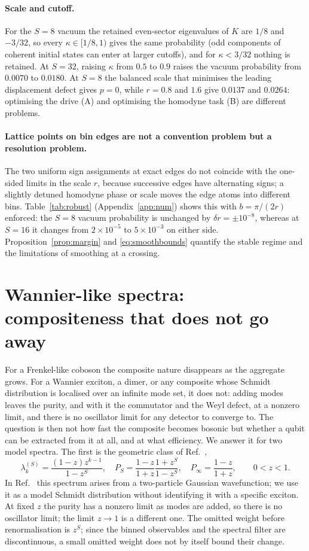 \documentclass[11pt,a4paper]{article}
\begin{document}
\paragraph{Scale and cutoff.}
For the $S=8$ vacuum the retained even-sector eigenvalues of $K$ are $1/8$ and $-3/32$, so every $\kappa\in[1/8,1)$ gives the same probability (odd components of coherent initial states can enter at larger cutoffs), and for $\kappa<3/32$ nothing is retained. At $S=32$, raising $\kappa$ from $0.5$ to $0.9$ raises the vacuum probability from $0.0070$ to $0.0180$. At $S=8$ the balanced scale that minimises the leading displacement defect gives $p=0$, while $r=0.8$ and $1.6$ give $0.0137$ and $0.0264$: optimising the drive (A) and optimising the homodyne task (B) are different problems.

\paragraph{Lattice points on bin edges are not a convention problem but a resolution problem.}
The two uniform sign assignments at exact edges do not coincide with the one-sided limits in the scale $r$, because successive edges have alternating signs; a slightly detuned homodyne phase or scale moves the edge atoms into different bins. Table~\ref{tab:robust} (Appendix~\ref{app:num}) shows this with $b=\pi/(2r)$ enforced: the $S=8$ vacuum probability is unchanged by $\delta r=\pm10^{-8}$, whereas at $S=16$ it changes from $2\times10^{-5}$ to $5\times10^{-3}$ on either side. Proposition~\ref{prop:margin} and \eqref{eq:smoothbounds} quantify the stable regime and the limitations of smoothing at a crossing.

\section{Wannier-like spectra: compositeness that does not go away}
\label{sec:purity}
For a Frenkel-like coboson the composite nature disappears as the aggregate grows. For a Wannier exciton, a dimer, or any composite whose Schmidt distribution is localised over an infinite mode set, it does not: adding modes leaves the purity, and with it the commutator and the Weyl defect, at a nonzero limit, and there is no oscillator limit for any detector to converge to. The question is then not how fast the composite becomes bosonic but whether a qubit can be extracted from it at all, and at what efficiency. We answer it for two model spectra. The first is the geometric class of Ref.~\cite{Law2005},
\begin{equation}
\lambda_k^{(S)}=\frac{(1-z)z^{k-1}}{1-z^S},\quad
P_S=\frac{1-z}{1+z}\frac{1+z^S}{1-z^S},\quad
P_\infty=\frac{1-z}{1+z},\qquad 0<z<1.
\label{eq:geom}
\end{equation}
In Ref.~\cite{Law2005} this spectrum arises from a two-particle Gaussian wavefunction; we use it as a model Schmidt distribution without identifying it with a specific exciton. At fixed $z$ the purity has a nonzero limit as modes are added, so there is no oscillator limit; the limit $z\to1$ is a different one. The omitted weight before renormalisation is $z^S$; since the binned observables and the spectral filter are discontinuous, a small omitted weight does not by itself bound their change.
\end{document}
